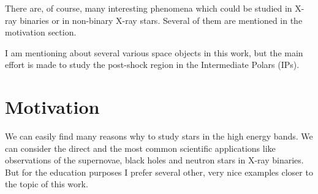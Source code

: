 \documentclass[oneside,a4paper,11pt]{report}
\begin{document}
There are, of course, many interesting phenomena which could be studied in X-ray binaries or in non-binary X-ray stars. 
Several of them are mentioned in the motivation section. 

I am mentioning about several various space objects in this work, but the main effort is made to 
study the post-shock region in the Intermediate Polars (IPs).   


\section{Motivation}
We can easily find many reasons why to study stars in the high energy bands.  
We can consider the direct and the most common scientific applications like observations of 
the supernovae, black holes and neutron stars in X-ray binaries. But for the education purposes 
I prefer several other, very nice examples closer to the topic of this work.  
\end{document}
